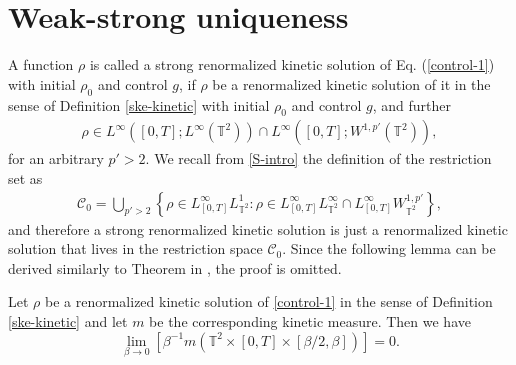 \section{Weak-strong uniqueness}\label{sec-ws!}
A function $\rho$ is called a strong renormalized kinetic solution of Eq. (\ref{control-1}) with initial  $\rho_0$ and control $g$, if $\rho$ be a renormalized kinetic solution of it in the sense of Definition \ref{ske-kinetic} with initial  $\rho_0$ and control $g$, and further 
\begin{align*}
\rho\in L^\infty([0,T];L^\infty(\mathbb{T}^2))\cap L^\infty([0,T];W^{1,p'}(\mathbb{T}^2)), 
\end{align*}
for an arbitrary $p'>2$. We recall from \eqref{S-intro} the definition of the restriction set as 
\begin{align*}
\mathcal{C}_0 = \bigcup_{p'>2}\left\{\rho\in L_{[0,T]}^{\infty}L^1_{\mathbb{T}^2} : \rho\in L_{[0,T]}^{\infty}L^{\infty}_{\mathbb{T}^2} \cap L_{[0,T]}^{\infty}W_{\mathbb{T}^2}^{1,p'}\right\},
\end{align*}
and therefore a strong renormalized kinetic solution is just a renormalized kinetic solution that lives in the restriction space $\mathcal{C}_0$. Since the following lemma can be derived similarly to Theorem in \cite[Theorem 4.6]{FG21}, the proof is omitted. 
\begin{lem}\label{KM V0 remark}
Let $\rho$ be a renormalized kinetic solution of \eqref{control-1} in the sense of Definition \ref{ske-kinetic} and let $m$ be  the corresponding kinetic measure. Then we have
\begin{equation}\label{KM V0}
  \lim _{\beta \rightarrow 0}\left[\beta^{-1} m\left(\mathbb{T}^2 \times[0, T] \times[\beta / 2, \beta]\right)\right]=0.
\end{equation}

\end{lem}


